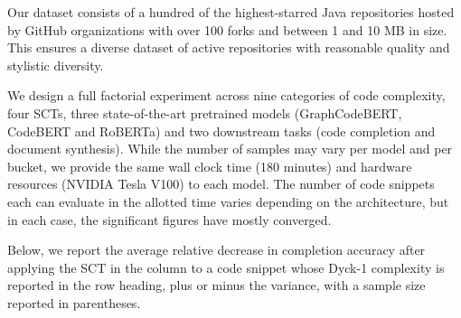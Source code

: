 \documentclass{article} %
\begin{document}
Our dataset consists of a hundred of the highest-starred Java repositories hosted by GitHub organizations with over 100 forks and between 1 and 10 MB in size. This ensures a diverse dataset of active repositories with reasonable quality and stylistic diversity.

We design a full factorial experiment across nine categories of code complexity, four SCTs, three state-of-the-art pretrained models (GraphCodeBERT, CodeBERT and RoBERTa) and two downstream tasks (code completion and document synthesis). While the number of samples may vary per model and per bucket, we provide the same wall clock time (180 minutes) and hardware resources (NVIDIA Tesla V100) to each model. The number of code snippets each can evaluate in the allotted time varies depending on the architecture, but in each case, the significant figures have mostly converged.

Below, we report the average relative decrease in completion accuracy after applying the SCT in the column to a code snippet whose Dyck-1 complexity is reported in the row heading, plus or minus the variance, with a sample size reported in parentheses.\\
\end{document}
